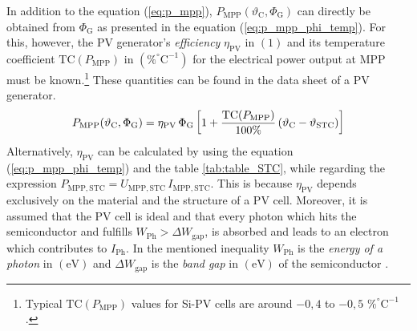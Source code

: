 In addition to the equation (\ref{eq:p_mpp}), $P_{\mathrm{MPP}}(\vartheta_{\mathrm{C}}, \Phi_{\mathrm{G}})$ can directly be obtained from $\Phi_{\mathrm G}$ as presented in the equation (\ref{eq:p_mpp_phi_temp}). For this, however, the PV generator's \emph{efficiency} $\eta_{\mathrm{PV}}$ in $\left(1\right)$ and its temperature coefficient $\mathrm{TC}(P_{\mathrm{MPP}})$ in $\left( \% ^\circ \mathrm{C}^{-1}\right)$ for the electrical power output at MPP must be known.\footnote{Typical $\mathrm{TC}(P_{\mathrm{MPP}})$ values for Si-PV cells are around $-0,4$ to $-0,5$ $\% ^\circ \mathrm{C}^{-1}$.} These quantities can be found in the data sheet of a PV generator. 
	\begin{equation} \label{eq:p_mpp_phi_temp}
	\centering
		 P_{\mathrm{MPP}}(\vartheta_{\mathrm{C}}, \Phi_{\mathrm{G}}) = \eta_{\mathrm{PV}} \, \Phi_{\mathrm G} \left[ 1 + \frac{\mathrm{TC}(P_{\mathrm{MPP}})}{100\%} \left(\vartheta_{\mathrm{C}} - \vartheta_{\mathrm{STC}} \right) \right]
	\end{equation}
Alternatively, $\eta_{\mathrm{PV}}$ can be calculated by using the equation (\ref{eq:p_mpp_phi_temp}) and the table \ref{tab:table_STC}, while regarding the expression $P_\mathrm{MPP,STC} = U_\mathrm{MPP,STC} \, I_\mathrm{MPP,STC}$. This is because $\eta_{\mathrm{PV}}$ depends exclusively on the material and the structure of a PV cell. Moreover, it is assumed that the PV cell is ideal and that every photon which hits the semiconductor and fulfills $W_{\mathrm{Ph}} > \Delta W_{\mathrm{gap}}$, is absorbed and leads to an electron which contributes to $I_\mathrm{Ph}$. In the mentioned inequality $W_{\mathrm{Ph}}$ is the \emph{energy of a photon} in $\left(\mathrm{eV}\right)$ and $\Delta W_{\mathrm{gap}}$ is the \emph{band gap} in $\left(\mathrm{eV}\right)$ of the semiconductor \cite{Mertens:2015, Wagner:2018}.

